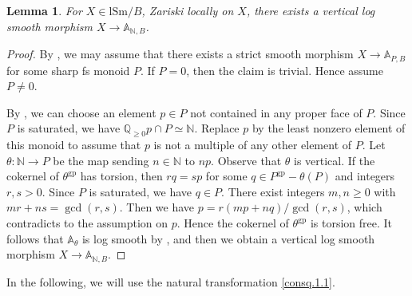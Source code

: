 \documentclass[10pt]{amsart}
\newtheorem{lem}[thm]{Lemma}
\theoremstyle{definition}
\theoremstyle{remark}
\numberwithin{equation}{subsection}
\newcommand{\A}{\mathbb{A}}
\newcommand{\N}{\mathbb{N}}
\newcommand{\Q}{\mathbb{Q}}
\newcommand{\lSm}{\mathrm{lSm}}
\newcommand{\gp}{\mathrm{gp}}
\begin{document}
\begin{lem}
\label{local.13}
For $X\in \lSm/B$,
Zariski locally on $X$, there exists a vertical log smooth morphism $X\to \A_{\N,B}$.
\end{lem}
\begin{proof}
By \cite[Lemma A.5.9]{logDM}, we may assume that there exists a strict smooth morphism $X\to \A_{P,B}$ for some sharp fs monoid $P$.
If $P=0$, then the claim is trivial.
Hence assume $P\neq 0$.


By \cite[Corollary I.2.3.17(3)]{Ogu},
we can choose an element $p\in P$ not contained in any proper face of $P$.
Since $P$ is saturated,
we have $\Q_{\geq 0}p\cap P\simeq \N$.
Replace $p$ by the least nonzero element of this monoid to assume that $p$ is not a multiple of any other element of $P$.
Let $\theta\colon \N\to P$ be the map sending $n\in \N$ to $np$.
Observe that $\theta$ is vertical.
If the cokernel of $\theta^\gp$ has torsion, then $rq=sp$ for some $q\in P^\gp-\theta(P)$ and integers $r,s>0$.
Since $P$ is saturated, we have $q\in P$.
There exist integers $m,n\geq 0$ with $mr+ns=\gcd(r,s)$.
Then we have $p=r(mp+nq)/\gcd(r,s)$, which contradicts to the assumption on $p$.
Hence the cokernel of $\theta^\gp$ is torsion free.
It follows that $\A_\theta$ is log smooth by \cite[Theorem IV.3.1.8]{Ogu}, and 
then we obtain a vertical log smooth morphism $X\to \A_{\N,B}$.
\end{proof}

In the following, we will use the natural transformation \eqref{consq.1.1}.
\end{document}
